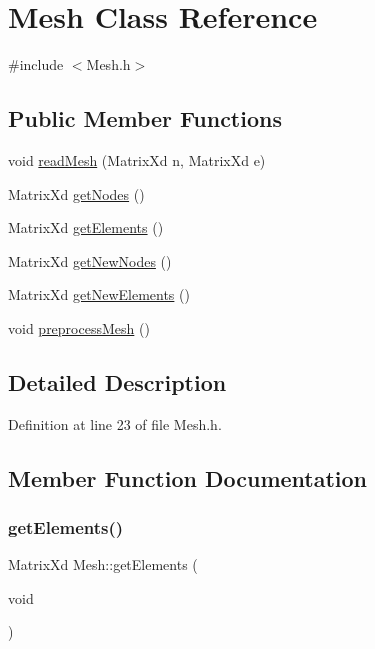 \hypertarget{class_mesh}{}\section{Mesh Class Reference}
\label{class_mesh}


{\ttfamily \#include $<$Mesh.\+h$>$}

\subsection*{Public Member Functions}
\begin{DoxyCompactItemize}
\item 
void \hyperlink{class_mesh_a2e0931c78a7ef01ccc9bf8f0dd74afb0}{read\+Mesh} (Matrix\+Xd n, Matrix\+Xd e)
\item 
Matrix\+Xd \hyperlink{class_mesh_a0b0f7458f07745240d9bda967cda12de}{get\+Nodes} ()
\item 
Matrix\+Xd \hyperlink{class_mesh_af3cbe568c8a36832659ac01025e8d774}{get\+Elements} ()
\item 
Matrix\+Xd \hyperlink{class_mesh_a52ecce406bbef80cbf3610db3ea5ea40}{get\+New\+Nodes} ()
\item 
Matrix\+Xd \hyperlink{class_mesh_af242dbb4627c09410975a0e67389e0de}{get\+New\+Elements} ()
\item 
void \hyperlink{class_mesh_aa8a6f260e9589be4c0a2fcc146e696d5}{preprocess\+Mesh} ()
\end{DoxyCompactItemize}


\subsection{Detailed Description}


Definition at line 23 of file Mesh.\+h.



\subsection{Member Function Documentation}
\mbox{\label{class_mesh_af3cbe568c8a36832659ac01025e8d774}} 
\subsubsection{\texorpdfstring{get\+Elements()}{getElements()}}
{\footnotesize\ttfamily Matrix\+Xd Mesh\+::get\+Elements (\begin{DoxyParamCaption}\item[{void}]{ }\end{DoxyParamCaption})}



